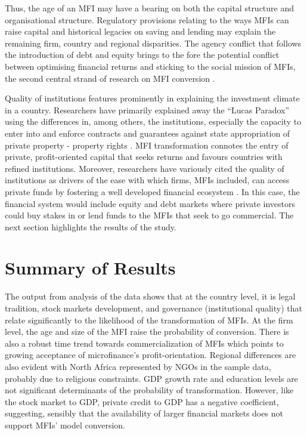 \documentclass[a4paper,nobind]{templates/ociamthesis}
\begin{document}
Thus, the age of an MFI may have a bearing on both the capital structure and organisational structure. Regulatory provisions relating to the ways MFIs can raise capital and historical legacies on saving and lending \autocite{bayai2016financing} may explain the remaining firm, country and regional disparities. The agency conflict that follows the introduction of debt and equity brings to the fore the potential conflict between optimising financial returns and sticking to the social mission of MFIs, the second central strand of research on MFI conversion \autocite{nurmakhanova2015trade,bayai2016financing,abdulai2017trade,awaworyi2018sustainability}.

Quality of institutions features prominently in explaining the investment climate in a country. Researchers have primarily explained away the ``Lucas Paradox'' using the differences in, among others, the institutions, especially the capacity to enter into and enforce contracts and guarantees against state appropriation of private property - property rights \autocite{azemar2013has,goktan2015explanation}. MFI transformation connotes the entry of private, profit-oriented capital that seeks returns and favours countries with refined institutions. Moreover, researchers have variously cited the quality of institutions as drivers of the ease with which firms, MFIs included, can access private funds by fostering a well developed financial ecosystem \autocite{huang2010political,kaidi2019financial}. In this case, the financial system would include equity and debt markets where private investors could buy stakes in or lend funds to the MFIs that seek to go commercial. The next section highlights the results of the study.

\hypertarget{summary-of-results}{%
\section{Summary of Results}\label{summary-of-results}}

The output from analysis of the data shows that at the country level, it is legal tradition, stock markets development, and governance (institutional quality) that relate significantly to the likelihood of the transformation of MFIs. At the firm level, the age and size of the MFI raise the probability of conversion. There is also a robust time trend towards commercialization of MFIs which points to growing acceptance of microfinance's profit-orientation. Regional differences are also evident with North Africa represented by NGOs in the sample data, probably due to religious constraints. GDP growth rate and education levels are not significant determinants of the probability of transformation. However, like the stock market to GDP, private credit to GDP has a negative coefficient, suggesting, sensibly that the availability of larger financial markets does not support MFIs' model conversion.
\end{document}
